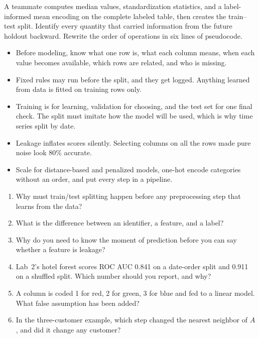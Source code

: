 \begin{debugtask}
A teammate computes median values, standardization statistics, and a label-informed mean encoding on the complete labeled table, then creates the train--test split. Identify every quantity that carried information from the future holdout backward. Rewrite the order of operations in six lines of pseudocode.
\end{debugtask}

\begin{chapterrecap}
\begin{itemize}
  \item Before modeling, know what one row is, what each column means, when each value becomes available, which rows are related, and who is missing.
  \item Fixed rules may run before the split, and they get logged. Anything learned from data is fitted on training rows only.
  \item Training is for learning, validation for choosing, and the test set for one final check. The split must imitate how the model will be used, which is why time series split by date.
  \item Leakage inflates scores silently. Selecting columns on all the rows made pure noise look 80\% accurate.
  \item Scale for distance-based and penalized models, one-hot encode categories without an order, and put every step in a pipeline.
\end{itemize}
\end{chapterrecap}

\begin{quickcheck}
\begin{enumerate}
  \item Why must train/test splitting happen before any preprocessing step that learns from the data?
  \item What is the difference between an identifier, a feature, and a label?
  \item Why do you need to know the moment of prediction before you can say whether a feature is leakage?
  \item Lab~2's hotel forest scores ROC AUC 0.841 on a date-order split and 0.911 on a shuffled split. Which number should you report, and why?
  \item A column is coded 1 for red, 2 for green, 3 for blue and fed to a linear model. What false assumption has been added?
  \item In the three-customer example, which step changed the nearest neighbor of $A$, and did it change any customer?
\end{enumerate}
\end{quickcheck}
